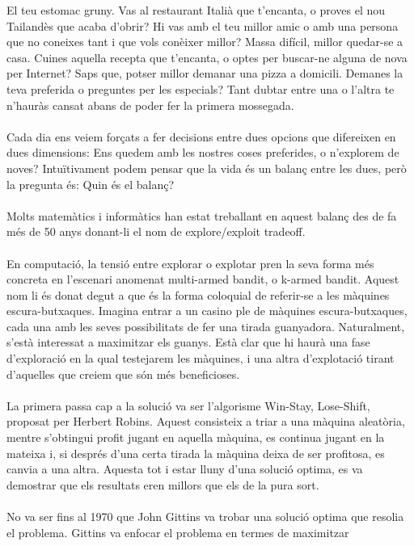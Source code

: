 
El teu estomac gruny. Vas al restaurant Italià que t'encanta,
o proves el nou Tailandès que acaba d'obrir? Hi vas amb el
teu millor amic o amb una persona que no coneixes tant i que
vols conèixer millor? Massa difícil, millor quedar-se a casa.
Cuines aquella recepta que t'encanta, o optes per buscar-ne
alguna de nova per Internet? Saps que, potser millor demanar
una pizza a domicili. Demanes la teva preferida o preguntes
per les especials? Tant dubtar entre una o l'altra te n'hauràs
cansat abans de poder fer la primera mossegada.
\\\\
Cada dia ens veiem forçats a fer decisions entre dues opcions
que difereixen en dues dimensions: Ens quedem amb les nostres
coses preferides, o n'explorem de noves? Intuïtivament podem
pensar que la vida és un balanç entre les dues, però la pregunta
és: Quin és el balanç?
\\\\
Molts matemàtics i informàtics han estat treballant en aquest
balanç des de fa més de 50 anys donant-li el nom de explore/exploit
tradeoff.
\\\\
En computació, la tensió entre explorar o explotar pren la seva
forma més concreta en l'escenari anomenat multi-armed bandit, o
k-armed bandit. Aquest nom li és donat degut a que és la forma
coloquial de referir-se a les màquines escura-butxaques.
Imagina entrar a un casino ple de màquines escura-butxaques,
cada una amb les seves possibilitats de fer una tirada guanyadora.
Naturalment, s'està interessat a maximitzar els guanys. Està clar
que hi haurà una fase d'exploració en la qual testejarem les màquines,
i una altra d'explotació tirant d'aquelles que creiem que són més
beneficioses.\\
\\
La primera passa cap a la solució va ser l'algorisme Win-Stay, Lose-Shift,
proposat per Herbert Robins. Aquest consisteix a triar a una màquina
aleatòria, mentre s'obtingui profit jugant en aquella màquina, es continua
jugant en la mateixa i, si després d'una certa tirada la màquina deixa de ser
profitosa, es canvia a una altra. Aquesta tot i estar lluny d'una solució optima,
es va demostrar que els resultats eren millors que els de la pura sort.\\
\\
No va ser fins al 1970 que John Gittins va trobar una solució optima que
resolia el problema. Gittins va enfocar el problema en termes de maximitzar
